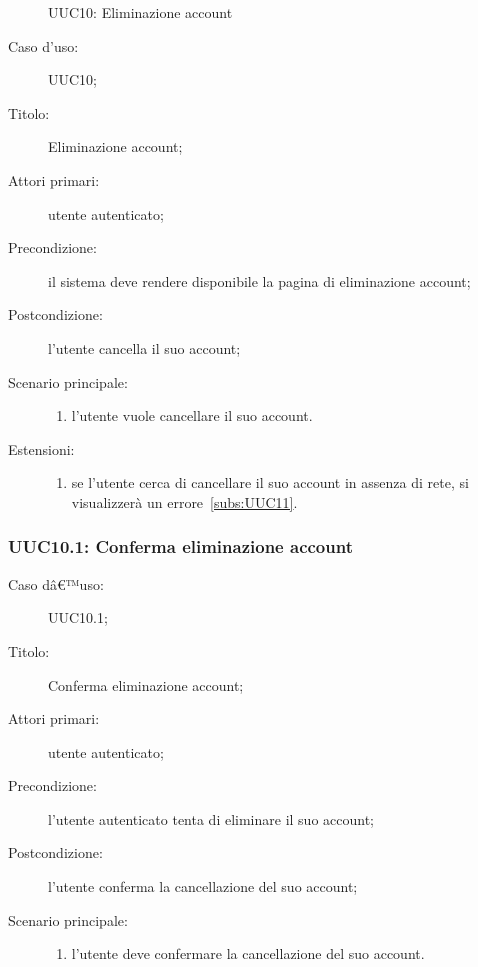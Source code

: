 \documentclass[../../../analisi-dei-requisiti.tex]{subfiles}
\begin{document}
\begin{figure}[H]
  \centering
  \caption{UUC10: Eliminazione account}%
  \label{fig:UUC10}
\end{figure}

\begin{description}
  \item[Caso d'uso:] UUC10;
  \item[Titolo:] Eliminazione account;
  \item[Attori primari:] utente autenticato;
  \item[Precondizione:] il sistema deve rendere disponibile la pagina di eliminazione account;
  \item[Postcondizione:] l'utente cancella il suo account;
  \item[Scenario principale:]
        \begin{enumerate}
          \item l'utente vuole cancellare il suo account.
        \end{enumerate}
  \item[Estensioni:]
        \begin{enumerate}
          \item se l'utente cerca di cancellare il suo account in assenza di rete, si visualizzerà un errore~\ref{subs:UUC11}.
        \end{enumerate}
\end{description}

\subsubsection{UUC10.1: Conferma eliminazione account}%
\label{subs:UUC10.1}

\begin{description}
  \item[Caso dâ€™uso:] UUC10.1;
  \item[Titolo:] Conferma eliminazione account;
  \item[Attori primari:] utente autenticato;
  \item[Precondizione:] l'utente autenticato tenta di eliminare il suo account;
  \item[Postcondizione:] l'utente conferma la cancellazione del suo account;
  \item[Scenario principale:]
        \begin{enumerate}
          \item l'utente deve confermare la cancellazione del suo account.
        \end{enumerate}
\end{description}
\end{document}
